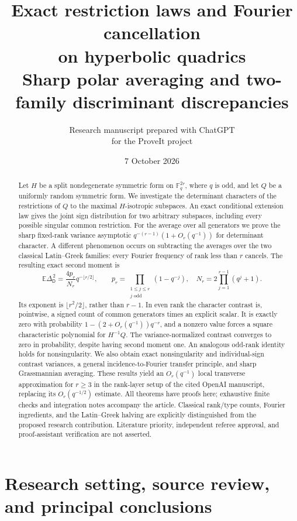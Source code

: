 \documentclass[11pt,a4paper]{article}
\title{Exact restriction laws and Fourier cancellation\\on hyperbolic quadrics\\[5pt]
\large Sharp polar averaging and two-family discriminant discrepancies}
\author{Research manuscript prepared with ChatGPT\\for the ProveIt project}
\date{7 October 2026}
\theoremstyle{definition}
\theoremstyle{remark}
\newcommand{\F}{\mathbb F}
\newcommand{\E}{\mathbb E}
\newcommand{\D}{\mathsf D}
\begin{document}
\maketitle
\begin{abstract}
Let $H$ be a split nondegenerate symmetric form on $\F_q^{2r}$, where $q$ is odd,
and let $Q$ be a uniformly random symmetric form. We investigate the determinant
characters of the restrictions of $Q$ to the maximal $H$-isotropic subspaces.
An exact conditional extension law gives the joint sign distribution for two
arbitrary subspaces, including every possible singular common restriction.
For the average over all generators we prove the sharp fixed-rank variance
asymptotic $q^{-(r-1)}(1+O_r(q^{-1}))$ for determinant character.
A different phenomenon occurs on subtracting the averages over the two classical
Latin--Greek families: every Fourier frequency of rank less than $r$ cancels.
The resulting exact second moment is
\[
 \E\Delta_{\D}^{\,2}
 =\frac{4p_r}{N_r}q^{-\lfloor r/2\rfloor},\qquad
 p_r=\prod_{\substack{1\le j\le r\\j\text{ odd}}}(1-q^{-j}),\quad
 N_r=2\prod_{j=1}^{r-1}(q^j+1).
\]
Its exponent is $\lfloor r^2/2\rfloor$, rather than $r-1$.
In even rank the character contrast is, pointwise, a signed count of common
generators times an explicit scalar. It is exactly zero with probability
$1-(2+O_r(q^{-1}))q^{-r}$, and a nonzero value forces a square characteristic
polynomial for $H^{-1}Q$. The variance-normalized contrast converges to zero
in probability, despite having second moment one. An analogous odd-rank
identity holds for nonsingularity.
We also obtain exact nonsingularity and individual-sign contrast variances,
a general incidence-to-Fourier transfer principle, and sharp Grassmannian
averaging. These results yield an $O_r(q^{-1})$ local transverse approximation
for $r\ge3$ in the rank-layer setup of the cited OpenAI manuscript, replacing
its $O_r(q^{-1/2})$ estimate. All theorems have proofs here; exhaustive finite
checks and integration notes accompany the article. Classical rank/type counts,
Fourier ingredients, and the Latin--Greek halving are explicitly distinguished
from the proposed research contribution. Literature priority, independent
referee approval, and proof-assistant verification are not asserted.
\end{abstract}
\newpage
\tableofcontents
\newpage

\section{Research setting, source review, and principal conclusions}
\label{sec:intro}
\end{document}
